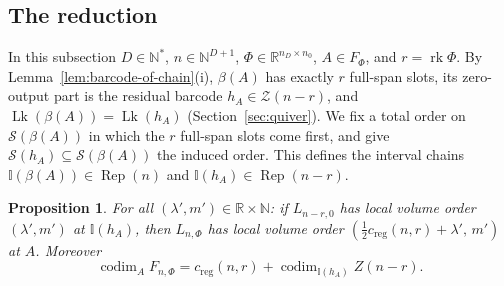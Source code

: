 \documentclass[11pt,a4paper]{article}
\newtheorem{proposition}[theorem]{Proposition}
\theoremstyle{definition}
\theoremstyle{remark}
\numberwithin{equation}{section}
\newcommand{\N}{\mathbb{N}}
\newcommand{\R}{\mathbb{R}}
\newcommand{\Rep}{\operatorname{Rep}}
\newcommand{\rk}{\operatorname{rk}}
\newcommand{\codim}{\operatorname{codim}}
\newcommand{\creg}{c_{\mathrm{reg}}}
\newcommand{\Zb}{\mathcal Z}
\newcommand{\I}{\mathbb I}
\newcommand{\Sl}{\mathcal S}
\newcommand{\Lk}{\operatorname{Lk}}
\begin{document}
\subsection{The reduction}
In this subsection $D\in\N^*$, $n\in\N^{D+1}$, $\Phi\in\R^{n_D\times n_0}$, $A\in F_\Phi$, and $r=\rk\Phi$. By Lemma~\ref{lem:barcode-of-chain}(i), $\beta(A)$ has exactly $r$ full-span slots, its zero-output part is the residual barcode $h_A\in\Zb(n-r)$, and $\Lk(\beta(A))=\Lk(h_A)$ (Section~\ref{sec:quiver}). We fix a total order on $\Sl(\beta(A))$ in which the $r$ full-span slots come first, and give $\Sl(h_A)\subseteq\Sl(\beta(A))$ the induced order. This defines the interval chains $\I(\beta(A))\in\Rep(n)$ and $\I(h_A)\in\Rep(n-r)$.

\begin{proposition}\label{prop:reduction}
For all $(\lambda',m')\in\R\times\N$: if $L_{n-r,0}$ has local volume order $(\lambda',m')$ at $\I(h_A)$, then $L_{n,\Phi}$ has local volume order $(\tfrac12\creg(n,r)+\lambda',\,m')$ at $A$. Moreover
\[
\codim_AF_{n,\Phi}=\creg(n,r)+\codim_{\I(h_A)}Z(n-r).
\]
\end{proposition}
\end{document}
